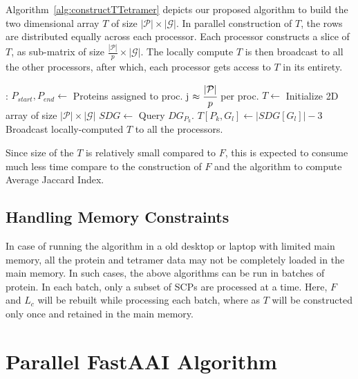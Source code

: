 \documentclass{article}[11pt]
\begin{document}
Algorithm~\ref{alg:constructTTetramer} depicts our proposed algorithm to build the two dimensional array $T$ of size $|\mathcal{P}| \times |\mathcal{G}|$. 
In parallel construction of $T$, the rows are distributed equally across each processor.
Each processor constructs a slice of $T$, as sub-matrix of size $\frac{|\mathcal{P}|}{p} \times |\mathcal{G}|$.
The locally compute $T$ is then broadcast to all the other processors, after which, each processor gets access to $T$ in its entirety. 
\begin{algorithm}[H]
\caption{Construct $T$ in parallel}
\label{alg:constructTTetramer}
    \begin{algorithmic}[1]
        :
          \State $P_{start}, P_{end} \gets$ Proteins assigned to proc. j
          \Comment  $\approx \cfrac{|\mathcal{P}|}{p}$ per proc.
          \State $T\gets$ Initialize 2D array of size $|\mathcal{P}|\times |\mathcal{G}|$
             \State $SDG \gets$ Query $DG_{P_k}$.
                    \State $T[P_k, G_l] \gets|SDG[G_l]| - 3$
             \EndFor
          \EndFor
          \State Broadcast locally-computed $T$ to all the processors.
        \EndFunction
    \end{algorithmic}
\end{algorithm}
Since size of the $T$ is relatively small compared to $F$, this is expected to consume much less time compare to the construction of $F$ and the algorithm to compute Average Jaccard Index.

\subsection{Handling Memory Constraints}
\label{sec:memoryconstraint}
In case of running the algorithm in a old desktop or laptop with limited main memory, all the protein and tetramer data may not be completely loaded in the main memory.
In such cases, the above algorithms can be run in batches of protein.
In each batch, only a subset of SCPs are processed at a time. 
Here, $F$ and $L_c$ will be rebuilt while processing each batch, where as $T$ will be constructed only once and retained in the main memory. 


\section{Parallel FastAAI Algorithm}
\end{document}
